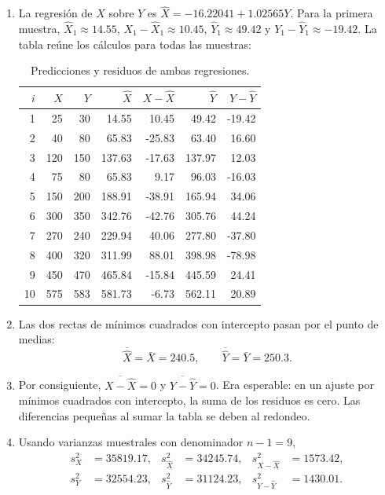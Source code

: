 \begin{enumerate}
    \item[\textbf{d)}] La regresión de $X$ sobre $Y$ es $\widehat X=-16.22041+1.02565Y$. Para la primera muestra, $\widehat X_1\approx14.55$, $X_1-\widehat X_1\approx10.45$, $\widehat Y_1\approx49.42$ y $Y_1-\widehat Y_1\approx-19.42$. La tabla reúne los cálculos para todas las muestras:
    \begin{table}[H]
    \centering
    \scriptsize
    \setlength{\tabcolsep}{5pt}
    \renewcommand{\arraystretch}{1.08}
    \begin{tabular}{r r r r r r r}
    \hline
    $i$ & $X$ & $Y$ & $\widehat X$ & $X-\widehat X$ & $\widehat Y$ & $Y-\widehat Y$ \\
    \hline
    1 & 25 & 30 & 14.55 & 10.45 & 49.42 & -19.42 \\
    2 & 40 & 80 & 65.83 & -25.83 & 63.40 & 16.60 \\
    3 & 120 & 150 & 137.63 & -17.63 & 137.97 & 12.03 \\
    4 & 75 & 80 & 65.83 & 9.17 & 96.03 & -16.03 \\
    5 & 150 & 200 & 188.91 & -38.91 & 165.94 & 34.06 \\
    6 & 300 & 350 & 342.76 & -42.76 & 305.76 & 44.24 \\
    7 & 270 & 240 & 229.94 & 40.06 & 277.80 & -37.80 \\
    8 & 400 & 320 & 311.99 & 88.01 & 398.98 & -78.98 \\
    9 & 450 & 470 & 465.84 & -15.84 & 445.59 & 24.41 \\
    10 & 575 & 583 & 581.73 & -6.73 & 562.11 & 20.89 \\
    \hline
    \end{tabular}
    \caption{Predicciones y residuos de ambas regresiones.}
    \label{tab:clase5-metodos-predicciones}
    \end{table}

    \item[\textbf{e)}] Las dos rectas de mínimos cuadrados con intercepto pasan por el punto de medias:
    \[
    \overline{\widehat X}=\bar X=240.5,\qquad \overline{\widehat Y}=\bar Y=250.3.
    \]

    \item[\textbf{f)}] Por consiguiente, $\overline{X-\widehat X}=0$ y $\overline{Y-\widehat Y}=0$. Era esperable: en un ajuste por mínimos cuadrados con intercepto, la suma de los residuos es cero. Las diferencias pequeñas al sumar la tabla se deben al redondeo.

    \item[\textbf{g)}] Usando varianzas muestrales con denominador $n-1=9$,
    \begin{align*}
    s_X^2&=35819.17,& s_{\widehat X}^2&=34245.74,& s_{X-\widehat X}^2&=1573.42,\\
    s_Y^2&=32554.23,& s_{\widehat Y}^2&=31124.23,& s_{Y-\widehat Y}^2&=1430.01.
    \end{align*}


\end{enumerate}
